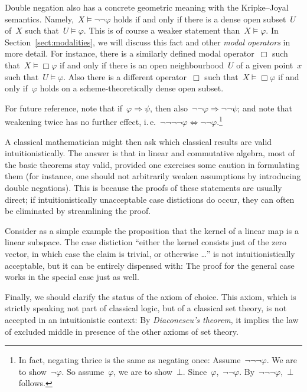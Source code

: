 \documentclass[10pt,reqno,a4paper]{amsbook}
\makeatletter
\theoremstyle{definition}
\theoremstyle{plain}
\theoremstyle{remark}
\newcommand{\?}{\,{:}\,}
\renewcommand{\_}{\mathpunct{.}\,}
\newcommand{\ie}{i.\,e.\@\xspace}
\makeatother
\begin{document}
Double negation also has a concrete geometric meaning with the
Kripke--Joyal semantics. Namely,~$X \models \neg\neg\varphi$ holds if and
only if there is a dense open subset~$U$ of~$X$ such that~$U \models \varphi$.
This is of course a weaker statement than~$X \models \varphi$.
In Section~\ref{sect:modalities}, we will discuss this fact and other
\emph{modal operators} in more detail. For instance, there is a similarly defined modal
operator~$\Box$ such that~$X \models \Box\varphi$ if and only if there is an
open neighbourhood~$U$ of a given point~$x$ such that~$U \models \varphi$. Also
there is a different operator~$\Box$ such that~$X \models \Box\varphi$ if and only
if~$\varphi$ holds on a scheme-theoretically dense open subset.

For future reference, note that if~$\varphi \Rightarrow \psi$,
then also~$\neg\neg\varphi \Rightarrow \neg\neg\psi$; and note that weakening
twice has no further effect, \ie~$\neg\neg\neg\neg\varphi \Leftrightarrow
\neg\neg\varphi$.\footnote{In fact, negating thrice is the same as negating
once: Assume~$\neg\neg\neg\varphi$. We are to show~$\neg\varphi$. So
assume~$\varphi$, we are to show~$\bot$. Since~$\varphi$,~$\neg\neg\varphi$.
By~$\neg\neg\neg\varphi$,~$\bot$ follows.}

A classical mathematician might then ask which classical results are valid
intuitionistically. The answer is that in linear and commutative algebra, most
of the basic theorems stay valid, provided one exercises some caution in
formulating them (for instance, one should not arbitrarily weaken assumptions
by introducing double negations). This is because the proofs of these
statements are usually direct; if intuitionistically unacceptable case
distictions do occur, they can often be eliminated by streamlining the proof.

Consider as a simple example the proposition that the kernel of a linear map is
a linear subspace. The case distiction ``either the kernel consists just of the
zero vector, in which case the claim is trivial, or otherwise \ldots'' is not
intuitionistically acceptable, but it can be entirely dispensed with: The proof
for the general case works in the special case just as well.

Finally, we should clarify the status of the axiom of choice. This axiom, which
is strictly speaking not part of classical logic, but of a classical set
theory, is not accepted in an intuitionistic context: By \emph{Diaconescu's
theorem}, it implies the law of excluded middle in presence of the other axioms
of set theory.
\end{document}
